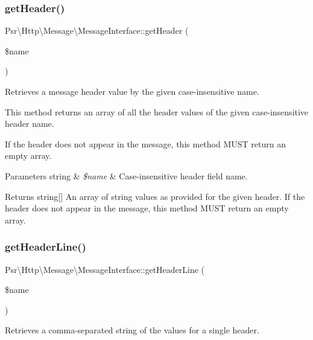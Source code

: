 \subsubsection{\texorpdfstring{get\+Header()}{getHeader()}}
{\footnotesize\ttfamily Psr\textbackslash{}\+Http\textbackslash{}\+Message\textbackslash{}\+Message\+Interface\+::get\+Header (\begin{DoxyParamCaption}\item[{}]{\$name }\end{DoxyParamCaption})}

Retrieves a message header value by the given case-\/insensitive name.

This method returns an array of all the header values of the given case-\/insensitive header name.

If the header does not appear in the message, this method M\+U\+ST return an empty array.


\begin{DoxyParams}[1]{Parameters}
string & {\em \$name} & Case-\/insensitive header field name. \\
\hline
\end{DoxyParams}
\begin{DoxyReturn}{Returns}
string\mbox{[}\mbox{]} An array of string values as provided for the given header. If the header does not appear in the message, this method M\+U\+ST return an empty array. 
\end{DoxyReturn}
\mbox{\label{interfacePsr_1_1Http_1_1Message_1_1MessageInterface_a0b6d444ab0d3241c0d58ad7186c57e97}} 
\subsubsection{\texorpdfstring{get\+Header\+Line()}{getHeaderLine()}}
{\footnotesize\ttfamily Psr\textbackslash{}\+Http\textbackslash{}\+Message\textbackslash{}\+Message\+Interface\+::get\+Header\+Line (\begin{DoxyParamCaption}\item[{}]{\$name }\end{DoxyParamCaption})}

Retrieves a comma-\/separated string of the values for a single header.

